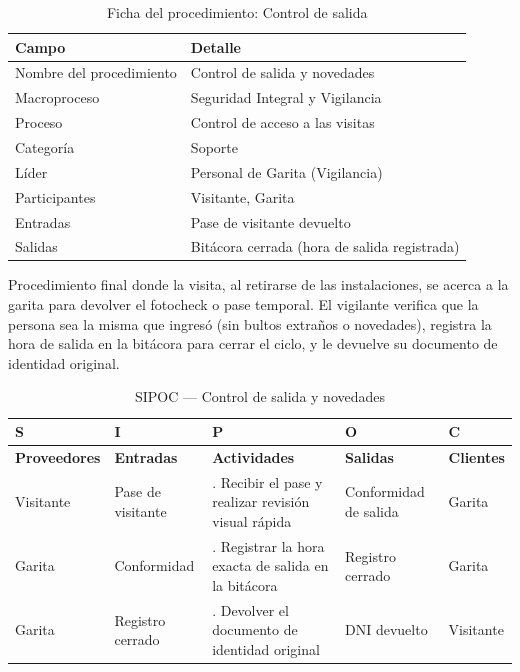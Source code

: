 \documentclass[11pt, a4paper, oneside]{report}
\begin{document}
\begin{table}[H]
\centering\small
\renewcommand{\arraystretch}{1.25}
\setlength{\tabcolsep}{6pt}
\begin{tabularx}{\textwidth}{|>{\raggedright\arraybackslash}p{}|>{\raggedright\arraybackslash}X|}
\hline
\rowcolor{upeu_mid}
\color{white}\bfseries Campo & \color{white}\bfseries Detalle \\ \hline
\rowcolor{gray!10}
Nombre del procedimiento & Control de salida y novedades \\ \hline
\rowcolor{gray!10}
Macroproceso & Seguridad Integral y Vigilancia \\ \hline
Proceso & Control de acceso a las visitas \\ \hline
\rowcolor{gray!10}
Categoría & Soporte \\ \hline
Líder & Personal de Garita (Vigilancia) \\ \hline
\rowcolor{gray!10}
Participantes & Visitante, Garita \\ \hline
Entradas & Pase de visitante devuelto \\ \hline
\rowcolor{gray!10}
Salidas & Bitácora cerrada (hora de salida registrada) \\ \hline
\end{tabularx}
\caption{Ficha del procedimiento: Control de salida}
\end{table}

Procedimiento final donde la visita, al retirarse de las instalaciones, se acerca a la garita para devolver el fotocheck o pase temporal. El vigilante verifica que la persona sea la misma que ingresó (sin bultos extraños o novedades), registra la hora de salida en la bitácora para cerrar el ciclo, y le devuelve su documento de identidad original.

\begin{table}[H]
\centering\small
\renewcommand{\arraystretch}{1.3}
\setlength{\tabcolsep}{4pt}
\begin{tabularx}{\textwidth}{|>{\raggedright\arraybackslash}p{}|>{\raggedright\arraybackslash}p{}|>{\raggedright\arraybackslash}X|>{\raggedright\arraybackslash}p{}|>{\raggedright\arraybackslash}p{}|}
\hline
\rowcolor{upeu_dark}
\color{white}\bfseries S & \color{white}\bfseries I & \color{white}\bfseries P & \color{white}\bfseries O & \color{white}\bfseries C \\ \hline
\rowcolor{upeu_light}
\bfseries Proveedores & \bfseries Entradas & \bfseries Actividades & \bfseries Salidas & \bfseries Clientes \\ \hline
Visitante & Pase de visitante & 1. Recibir el pase y realizar revisión visual rápida & Conformidad de salida & Garita \\ \hline
\rowcolor{gray!10}
Garita & Conformidad & 2. Registrar la hora exacta de salida en la bitácora & Registro cerrado & Garita \\ \hline
Garita & Registro cerrado & 3. Devolver el documento de identidad original & DNI devuelto & Visitante \\ \hline
\end{tabularx}
\caption{SIPOC --- Control de salida y novedades}
\end{table}
\end{document}
